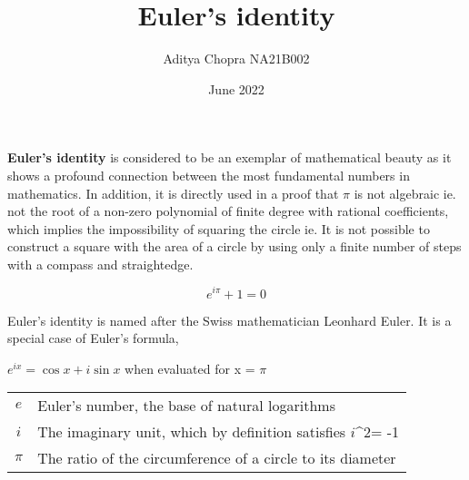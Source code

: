 \documentclass{article}
\title{\textbf{Euler's identity}}
\date{June 2022}
\author{Aditya Chopra NA21B002}
\begin{document}
  \maketitle
\large
\paragraph{}\textbf{Euler's identity} is considered to be an exemplar of mathematical beauty as it shows a profound connection between the most fundamental numbers in mathematics. In addition, it is directly used in a proof that $\pi$ is not algebraic ie. not the root of a non-zero polynomial of finite degree with rational coefficients, which implies the impossibility of squaring the circle ie. It is not possible to construct a square with the area of a circle by using only a finite number of steps with a compass and straightedge.

\vspace{1cm}


\boldmath
\begin{equation}
  e^{i\pi}+1=0
\end{equation}

\vspace{1cm}

Euler's identity is named after the Swiss mathematician Leonhard Euler. It is a special case of Euler's formula,

${\displaystyle e^{ix}=\cos x+i\sin x}$ when evaluated for x = $\pi$

\vspace{1cm}

\begin{tabular}{|c|l|}
    \hline
    $e$ & Euler's number, the base of natural logarithms\\
    $i$ & The imaginary unit, which by definition satisfies $i$^{2}=     -1\\
    $\pi$ & The ratio of the circumference of a circle to its diameter\\
    \hline
\end{tabular}
\end{document}
